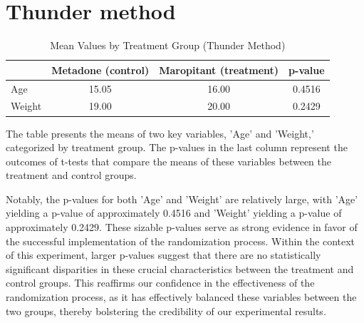 \documentclass{article}
\begin{document}
\section{Thunder method}
\begin{table}[htbp]
    \centering
    \caption{Mean Values by Treatment Group (Thunder Method)}
    \begin{tabular}{l*{3}{c}}
    \hline\hline
                & Metadone (control) & Maropitant (treatment) & p-value \\
    \hline
    Age         & 15.05 & 16.00 & 0.4516 \\
    Weight      & 19.00 & 20.00 & 0.2429 \\
    \hline\hline
    \end{tabular}
\end{table}
The table presents the means of two key variables, 'Age' and 'Weight,' categorized by treatment group. The p-values in
the last column represent the outcomes of t-tests that compare the means of these variables between the treatment and
control groups. \\
\par
Notably, the p-values for both 'Age' and 'Weight' are relatively large, with 'Age' yielding a p-value of approximately
0.4516 and 'Weight' yielding a p-value of approximately 0.2429. These sizable p-values serve as strong evidence in favor
of the successful implementation of the randomization process. Within the context of this experiment, larger p-values
suggest that there are no statistically significant disparities in these crucial characteristics between the treatment
and control groups. This reaffirms our confidence in the effectiveness of the randomization process, as it has
effectively balanced these variables between the two groups, thereby bolstering the credibility of our experimental
results. 
\end{document}
